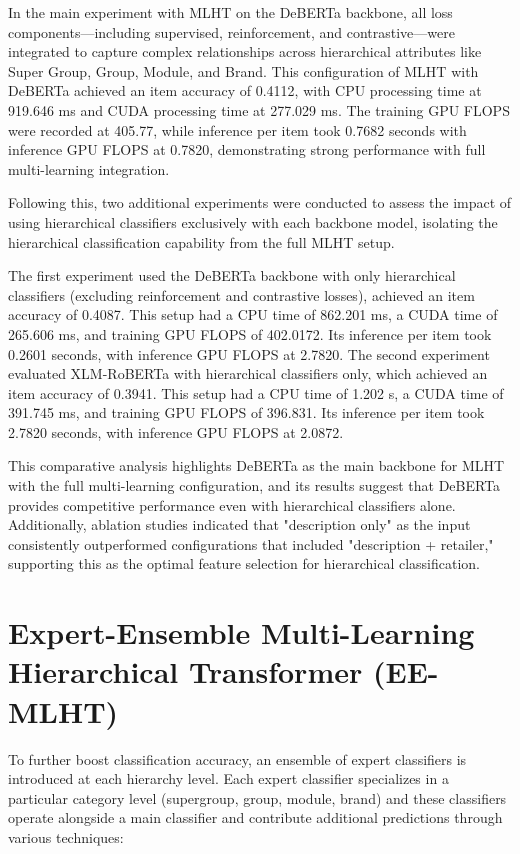 \documentclass[9pt,a4paper,twoside]{rho-class/rho}
\begin{document}
        In the main experiment with MLHT on the DeBERTa backbone, all loss components—including supervised, reinforcement, and contrastive—were integrated to capture complex relationships across hierarchical attributes like Super Group, Group, Module, and Brand. This configuration of MLHT with DeBERTa achieved an item accuracy of 0.4112, with CPU processing time at 919.646 ms and CUDA processing time at 277.029 ms. The training GPU FLOPS were recorded at 405.77, while inference per item took 0.7682 seconds with inference GPU FLOPS at 0.7820, demonstrating strong performance with full multi-learning integration.
        
        Following this, two additional experiments were conducted to assess the impact of using hierarchical classifiers exclusively with each backbone model, isolating the hierarchical classification capability from the full MLHT setup. 
        
        The first experiment used the DeBERTa backbone with only hierarchical classifiers (excluding reinforcement and contrastive losses), achieved an item accuracy of 0.4087. This setup had a CPU time of 862.201 ms, a CUDA time of 265.606 ms, and training GPU FLOPS of 402.0172. Its inference per item took 0.2601 seconds, with inference GPU FLOPS at 2.7820. The second experiment evaluated XLM-RoBERTa with hierarchical classifiers only, which achieved an item accuracy of 0.3941. This setup had a CPU time of 1.202 s, a CUDA time of 391.745 ms, and training GPU FLOPS of 396.831. Its inference per item took 2.7820 seconds, with inference GPU FLOPS at 2.0872.
        
        This comparative analysis highlights DeBERTa as the main backbone for MLHT with the full multi-learning configuration, and its results suggest that DeBERTa provides competitive performance even with hierarchical classifiers alone. Additionally, ablation studies indicated that "description only" as the input consistently outperformed configurations that included "description + retailer," supporting this as the optimal feature selection for hierarchical classification.

\section{Expert-Ensemble Multi-Learning Hierarchical Transformer (EE-MLHT)}

To further boost classification accuracy, an ensemble of expert classifiers is introduced at each hierarchy level. Each expert classifier specializes in a particular category level (supergroup, group, module, brand) and these classifiers operate alongside a main classifier and contribute additional predictions through various techniques:
\end{document}
